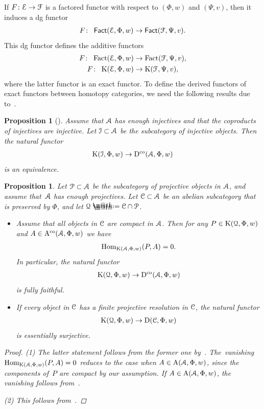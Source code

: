 \documentclass[pdftex]{sigma}%
\makeatletter
\newtheorem{prop}[dfn]{Proposition}
\newcommand*{\defeq}{\mathrel{\rlap{%
 \raisebox{0.3ex}{$\m@th\cdot$}}%
 \raisebox{-0.3ex}{$\m@th\cdot$}}%
 =}
\numberwithin{equation}{section}
\newcommand{\Fact}{\operatorname{Fact}}
\newcommand{\dgFact}{\operatorname{\sf{Fact}}}
\newcommand{\Hom}{\operatorname{Hom}}
\newcommand{\Dco}{\operatorname{D^{co}}}
\newcommand{\D}{\operatorname{D}}
\newcommand{\Aco}{\operatorname{A^{co}}}
\newcommand{\A}{\operatorname{A}}
\newcommand{\K}{\operatorname{K}}
\newcommand{\scrA}{\EuScript{A}}
\newcommand{\scrC}{\EuScript{C}}
\newcommand{\scrE}{\EuScript{E}}
\newcommand{\scrF}{\EuScript{F}}
\newcommand{\scrI}{\EuScript{I}}
\newcommand{\scrP}{\EuScript{P}}
\newcommand{\scrQ}{\EuScript{Q}}
\makeatother
\begin{document}
If $F\colon \scrE \to \scrF$ is a factored functor with respect to $(\Phi,w)$ and $(\Psi,v)$, then it induces a dg functor
\begin{gather*}
F\colon\ \dgFact(\scrE,\Phi,w)\to\dgFact(\scrF,\Psi,v).
\end{gather*}
This dg functor defines the additive functors
\begin{gather*}
F\colon\ \Fact(\scrE,\Phi,w)\to\Fact(\scrF,\Psi,v),
\\
F\colon\ \K(\scrE,\Phi,w)\to\K(\scrF,\Psi,v),
\end{gather*}
where the latter functor is an exact functor. To define the derived functors of exact functors between homotopy categories, we need the following results due to~\cite{bdfik}.

\begin{prop}[{\cite[Corollary~2.25]{bdfik}}]\label{inj resol}
Assume that $\scrA$ has enough injectives and that the coproducts of injectives are injective. Let $\scrI\subset \scrA$ be the subcategory of injective objects. Then the natural functor
\begin{gather*}
\K(\scrI,\Phi,w)\to\Dco(\scrA,\Phi,w)
\end{gather*}
is an equivalence.
\end{prop}

\begin{prop}\label{proj resol}
Let $\scrP\subset \scrA$ be the subcategory of projective objects in $\scrA$, and assume that~$\scrA$ has enough projectives. Let $\scrC\subset \scrA$ be an abelian subcategory that is preserved by $\Phi$, and let $\scrQ\defeq\scrC\cap \scrP$.
\begin{itemize}\itemsep=0pt
\item[$1.$] Assume that all objects in $\scrC$ are compact in $\scrA$. Then for any $P\in \K(\scrQ,\Phi,w)$ and $A\in \Aco(\scrA,\Phi,w)$ we have
\begin{gather*}
\Hom_{\K(\scrA,\Phi,w)}(P,A)=0.
\end{gather*}
In particular,
the natural functor
\begin{gather*}
\K(\scrQ,\Phi,w)\to\Dco(\scrA,\Phi,w)
\end{gather*}
is fully faithful.

\item[$2.$] If every object in $\scrC$ has a finite projective resolution in $\scrC$, the natural functor
\begin{gather*}
\K(\scrQ,\Phi,w)\to\D(\scrC,\Phi,w)
\end{gather*}
is essentially surjective.
\end{itemize}
\begin{proof}
(1) The latter statement follows from the former one by~\cite[Proposition~B.2]{ls}. The~vani\-shing $\Hom_{\K(\scrA,\Phi,w)}(P,A)=0$ reduces to the case when $A\in \A(\scrA,\Phi,w)$, since the components of~$P$ are compact by our assumption. If $A\in \A(\scrA,\Phi,w)$, the vanishing follows from~\cite[Lemma~2.4]{bdfik}.

(2) This follows from~\cite[Proposition~2.22]{bdfik}.
\end{proof}
\end{prop}
\end{document}

